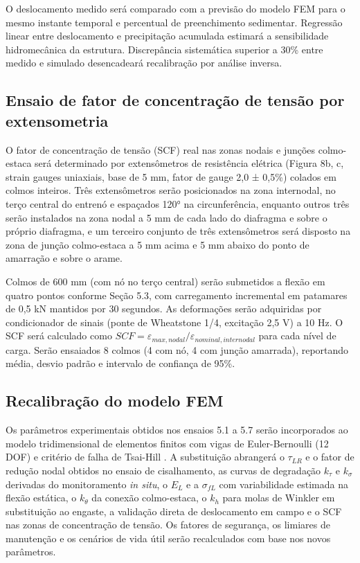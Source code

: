 \documentclass[
  brazilian,
  authoryear,
  preprint]{elsarticle}
\begin{document}
O deslocamento medido será comparado com a previsão do modelo FEM para o
mesmo instante temporal e percentual de preenchimento sedimentar.
Regressão linear entre deslocamento e precipitação acumulada estimará a
sensibilidade hidromecânica da estrutura. Discrepância sistemática
superior a 30\% entre medido e simulado desencadeará recalibração por
análise inversa.

\subsection{Ensaio de fator de concentração de tensão por
extensometria}\label{ensaio-de-fator-de-concentrauxe7uxe3o-de-tensuxe3o-por-extensometria}

O fator de concentração de tensão (SCF) real nas zonas nodais e junções
colmo-estaca \citep{pilkey_pilkey_2008} será determinado por
extensômetros de resistência elétrica (Figura 8b, c, strain gauges
uniaxiais, base de 5 mm, fator de gauge 2,0 ± 0,5\%) colados em colmos
inteiros. Três extensômetros serão posicionados na zona internodal, no
terço central do entrenó e espaçados 120° na circunferência, enquanto
outros três serão instalados na zona nodal a 5 mm de cada lado do
diafragma e sobre o próprio diafragma, e um terceiro conjunto de três
extensômetros será disposto na zona de junção colmo-estaca a 5 mm acima
e 5 mm abaixo do ponto de amarração e sobre o arame.

Colmos de 600 mm (com nó no terço central) serão submetidos a flexão em
quatro pontos conforme Seção 5.3, com carregamento incremental em
patamares de 0,5 kN mantidos por 30 segundos. As deformações serão
adquiridas por condicionador de sinais (ponte de Wheatstone 1/4,
excitação 2,5 V) a 10 Hz. O SCF será calculado como
\(SCF = \varepsilon_{max,nodal} / \varepsilon_{nominal,internodal}\)
para cada nível de carga. Serão ensaiados 8 colmos (4 com nó, 4 com
junção amarrada), reportando média, desvio padrão e intervalo de
confiança de 95\%.

\subsection{Recalibração do modelo
FEM}\label{recalibrauxe7uxe3o-do-modelo-fem}

Os parâmetros experimentais obtidos nos ensaios 5.1 a 5.7 serão
incorporados ao modelo tridimensional de elementos finitos com vigas de
Euler-Bernoulli (12 DOF) e critério de falha de Tsai-Hill
\citep{tsai_wu_1971, daniel_ishai_2006, bacharoudis_philippidis_2015}. A
substituição abrangerá o \(\tau_{LR}\) e o fator de redução nodal
obtidos no ensaio de cisalhamento, as curvas de degradação \(k_\tau\) e
\(k_\sigma\) derivadas do monitoramento \emph{in situ}, o \(E_L\) e a
\(\sigma_{fL}\) com variabilidade estimada na flexão estática, o
\(k_\theta\) da conexão colmo-estaca, o \(k_h\) para molas de Winkler
\citep{hetenyi_1946, reese_van_impe_2011} em substituição ao engaste, a
validação direta de deslocamento em campo e o SCF nas zonas de
concentração de tensão. Os fatores de segurança, os limiares de
manutenção e os cenários de vida útil serão recalculados com base nos
novos parâmetros.
\end{document}

